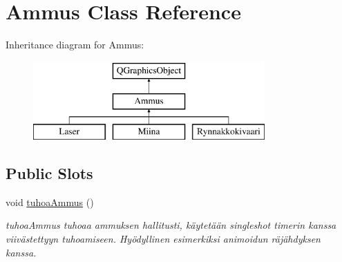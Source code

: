 \hypertarget{class_ammus}{\section{Ammus Class Reference}
\label{class_ammus}
}
Inheritance diagram for Ammus\-:\begin{figure}[H]
\begin{center}
\leavevmode
\includegraphics[height=3.000000cm]{class_ammus}
\end{center}
\end{figure}
\subsection*{Public Slots}
\begin{DoxyCompactItemize}
\item 
void \hyperlink{class_ammus_a29344837087d4864b8588e590b73732b}{tuhoa\-Ammus} ()
\begin{DoxyCompactList}\small\item\em tuhoa\-Ammus tuhoaa ammuksen hallitusti, käytetään singleshot timerin kanssa viivästettyyn tuhoamiseen. Hyödyllinen esimerkiksi animoidun räjähdyksen kanssa. \end{DoxyCompactList}\end{DoxyCompactItemize}
